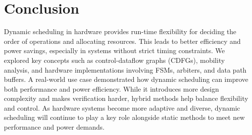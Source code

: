 \documentclass[conference]{IEEEtran}
\begin{document}
\section{Conclusion}
Dynamic scheduling in hardware provides run-time flexibility for deciding the order of operations and allocating resources. This leads to better efficiency and power savings, especially in systems without strict timing constraints. We explored key concepts such as control-dataflow graphs (CDFGs), mobility analysis, and hardware implementations involving FSMs, arbiters, and data path buffers. A real-world use case demonstrated how dynamic scheduling can improve both performance and power efficiency. While it introduces more design complexity and makes verification harder, hybrid methods help balance flexibility and control. As hardware systems become more adaptive and diverse, dynamic scheduling will continue to play a key role alongside static methods to meet new performance and power demands.


\printbibliography

\vspace{12pt}
\color{red}
\end{document}
